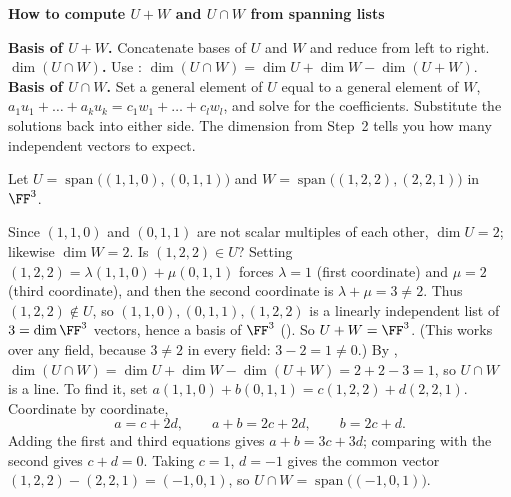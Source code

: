 \documentclass[10pt]{scrartcl}
\DeclareMathOperator{\spn}{span}
\newenvironment{methodbox}[1]{\begin{mdframed}[style=methodstyle]\textbf{\color{NavyBlue}#1}\par\vspace{2pt}}{\end{mdframed}}
\begin{document}
\begin{methodbox}{How to compute $U+W$ and $U\cap W$ from spanning lists}
  \begin{steps}
    \ii \textbf{Basis of $U+W$.} Concatenate bases of $U$ and $W$ and reduce from left to right.
    \ii \textbf{$\dim(U\cap W)$.} Use : $\dim(U\cap W)=\dim U+\dim W-\dim(U+W)$.
    \ii \textbf{Basis of $U\cap W$.} Set a general element of $U$ equal to a general element of $W$, $a_1u_1+\dots+a_ku_k=c_1w_1+\dots+c_lw_l$, and solve for the coefficients. Substitute the solutions back into either side. The dimension from Step~2 tells you how many independent vectors to expect.
  \end{steps}
\end{methodbox}

\begin{example*}
  Let $U=\spn\big((1,1,0),(0,1,1)\big)$ and $W=\spn\big((1,2,2),(2,2,1)\big)$ in $\FF^3$.
  \begin{steps}
    \ii Since $(1,1,0)$ and $(0,1,1)$ are not scalar multiples of each other, $\dim U=2$; likewise $\dim W=2$.
    \ii Is $(1,2,2)\in U$? Setting $(1,2,2)=\lambda(1,1,0)+\mu(0,1,1)$ forces $\lambda=1$ (first coordinate) and $\mu=2$ (third coordinate), and then the second coordinate is $\lambda+\mu=3\ne 2$. Thus $(1,2,2)\notin U$, so $(1,1,0),(0,1,1),(1,2,2)$ is a linearly independent list of $3=\dim\FF^3$ vectors, hence a basis of $\FF^3$ (). So $U+W=\FF^3$. (This works over any field, because $3\ne2$ in every field: $3-2=1\ne0$.)
    \ii By , $\dim(U\cap W)=\dim U+\dim W-\dim(U+W)=2+2-3=1$, so $U\cap W$ is a line.
    \ii To find it, set $a(1,1,0)+b(0,1,1)=c(1,2,2)+d(2,2,1)$. Coordinate by coordinate,
    \[
      a=c+2d,\qquad a+b=2c+2d,\qquad b=2c+d.
    \]
    Adding the first and third equations gives $a+b=3c+3d$; comparing with the second gives $c+d=0$. Taking $c=1$, $d=-1$ gives the common vector $(1,2,2)-(2,2,1)=(-1,0,1)$, so $U\cap W=\spn\big((-1,0,1)\big)$.
  \end{steps}
\end{example*}
\end{document}
